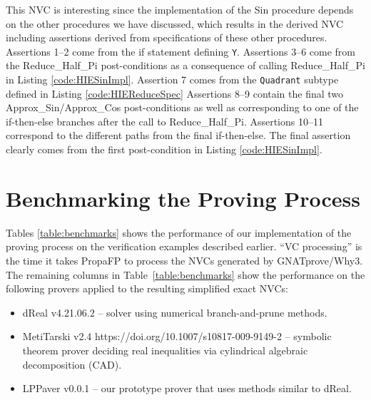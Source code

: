 \documentclass[runningheads]{llncs}
\begin{document}
This NVC is interesting since the implementation of the Sin procedure depends on the other procedures we have discussed, which results in the derived NVC including assertions derived from specifications of these other procedures.
Assertions 1--2 come from the if statement defining \lstinline{Y}.
Assertions 3--6 come from the Reduce\_Half\_Pi post-conditions as a consequence of calling Reduce\_Half\_Pi in Listing \ref{code:HIESinImpl}.
Assertion 7 comes from the \lstinline{Quadrant} subtype defined in Listing \ref{code:HIEReduceSpec}
Assertions 8--9 contain the final two Approx\_Sin/Approx\_Cos post-conditions as well as corresponding to one of the if-then-else branches after the call to Reduce\_Half\_Pi.
Assertions 10--11 correspond to the different paths from the final if-then-else. 
The final assertion clearly comes from the first post-condition in Listing \ref{code:HIESinImpl}.

\section{Benchmarking the Proving Process}\label{sec:benchmarks}

Tables \ref{table:benchmarks} shows
the performance of our implementation of the proving process on the verification examples described earlier.
``VC processing'' is the time it takes PropaFP to process the NVCs generated by GNATprove/Why3. 
The remaining columns in Table~\ref{table:benchmarks} show the performance on the following provers applied to the resulting simplified exact NVCs:
\begin{itemize}
  \item dReal v4.21.06.2 \cite{gao_dreal_2013} -- solver using numerical branch-and-prune methods.
  \item MetiTarski v2.4 https://doi.org/10.1007/s10817-009-9149-2 -- symbolic theorem prover deciding real inequalities via cylindrical algebraic decomposition (CAD).
  \item LPPaver v0.0.1 \cite{noauthor_rasheedjalppaver_nodate} -- our prototype prover that uses methods similar to dReal.
\end{itemize}
\end{document}
